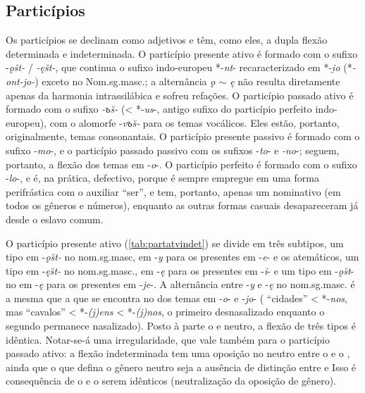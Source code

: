 \subsection{Particípios}\label{sec:participios}

Os particípios se declinam como adjetivos e têm, como eles, a dupla
flexão determinada e indeterminada. O particípio presente ativo é
formado com o sufixo -\emph{ǫšt-} / \emph{-ęšt-}, que continua o sufixo
indo-europeu *-\emph{nt}- recaracterizado em *-\emph{i̯o}
(*\emph{-ont-jo-}) exceto no Nom.sg.masc.; a alternância \emph{ǫ
$\sim$ ę} não resulta diretamente apenas da harmonia
intrassilábica e sofreu refações. O particípio passado ativo é formado
com o sufixo \emph{-ъs̆-} (< *-\emph{us}-, antigo sufixo do
particípio perfeito indo-europeu), com o alomorfe -\emph{vъs̆-} para os
temas vocálicos. Eles estão, portanto, originalmente, temas
consonantais. O particípio presente passivo é formado com o sufixo
-\emph{mo}-, e o particípio passado passivo com os sufixos -\emph{to}- e
\emph{-no}-; seguem, portanto, a flexão dos temas em -\emph{o}-. O
particípio perfeito é formado com o sufixo -\emph{lo}-, e é, na prática,
defectivo, porque é sempre empregue em uma forma perifrástica com o
auxiliar ``ser'', e tem, portanto, apenas um nominativo (em todos os
gêneros e números), enquanto as outras formas casuais desapareceram já
desde o eslavo comum.

O particípio presente ativo (\autoref{tab:partatvindet}) se divide em três subtipos, um
tipo em -\emph{ǫs̆t-} no nom.sg.masc, em -\emph{y} para os presentes em
-\emph{e}- e os atemáticos, um tipo em -\emph{ęs̆t-} no nom.sg.masc., em
-\emph{ę} para os presentes em -\emph{i}- e um tipo em -\emph{ǫs̆t}- no
 em -\emph{ę} para os presentes em -\emph{je}-. A alternância
entre -\emph{y} e -\emph{ę} no nom.sg.masc. é a mesma que a que se
encontra no  dos temas em -\emph{o}- e -\emph{jo}-
( ``cidades'' < \mbox{*-\emph{nos}}, mas 
``cavalos'' < *-\emph{(j)ens} < *-\emph{(j)nos}, o
primeiro desnasalizado enquanto o segundo permanece nasalizado). Posto à
parte o  e neutro, a flexão de três tipos é idêntica.
Notar-se-á uma irregularidade, que vale também para o particípio passado
ativo: a flexão indeterminada tem uma oposição no neutro entre o 
e o , ainda que o que defina o gênero neutro seja a ausência de
distinção entre  e  Isso é consequência de o
 e o  serem idênticos (neutralização da
oposição de gênero).

